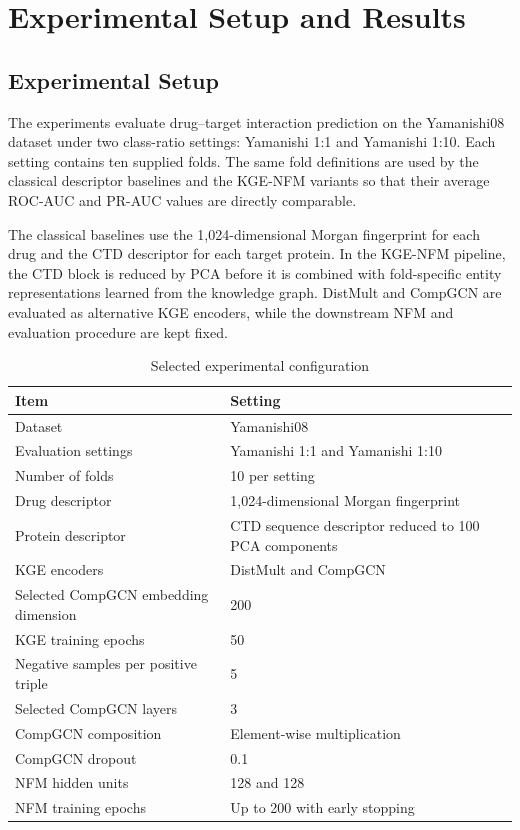 \chapter{Experimental Setup and Results}
\label{chap:experiments}

\section{Experimental Setup}

The experiments evaluate drug--target interaction prediction on the Yamanishi08
dataset under two class-ratio settings: Yamanishi 1:1 and Yamanishi 1:10. Each
setting contains ten supplied folds. The same fold definitions are used by the
classical descriptor baselines and the KGE-NFM variants so that their average
ROC-AUC and PR-AUC values are directly comparable.

The classical baselines use the 1,024-dimensional Morgan fingerprint for each
drug and the CTD descriptor for each target protein. In the KGE-NFM pipeline,
the CTD block is reduced by PCA before it is combined with fold-specific entity
representations learned from the knowledge graph. DistMult and CompGCN are
evaluated as alternative KGE encoders, while the downstream NFM and evaluation
procedure are kept fixed.

\begin{table}[H]
\centering
\caption{Selected experimental configuration}
\label{tab:experiment_setup}
\begin{tabularx}{\textwidth}{lX}
\toprule
\textbf{Item} & \textbf{Setting} \\
\midrule
Dataset & Yamanishi08 \\
Evaluation settings & Yamanishi 1:1 and Yamanishi 1:10 \\
Number of folds & 10 per setting \\
Drug descriptor & 1,024-dimensional Morgan fingerprint \\
Protein descriptor & CTD sequence descriptor reduced to 100 PCA components \\
KGE encoders & DistMult and CompGCN \\
Selected CompGCN embedding dimension & 200 \\
KGE training epochs & 50 \\
Negative samples per positive triple & 5 \\
Selected CompGCN layers & 3 \\
CompGCN composition & Element-wise multiplication \\
CompGCN dropout & 0.1 \\
NFM hidden units & 128 and 128 \\
NFM training epochs & Up to 200 with early stopping \\
\bottomrule
\end{tabularx}
\end{table}

